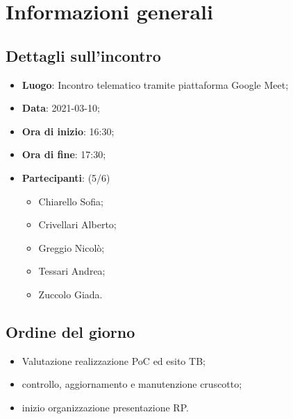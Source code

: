 \section{Informazioni generali}

\subsection{Dettagli sull'incontro}
\begin{itemize}
\item \textbf{Luogo}: Incontro telematico tramite piattaforma Google Meet;
\item \textbf{Data}: 2021-03-10;
\item \textbf{Ora di inizio}: 16:30;
\item \textbf{Ora di fine}: 17:30;
\item \textbf{Partecipanti}: (5/6)
\begin{itemize}
	\item Chiarello Sofia;
	\item Crivellari Alberto;
	\item Greggio Nicolò;
	\item Tessari Andrea;
	\item Zuccolo Giada.
\end{itemize}
\end{itemize}

\subsection{Ordine del giorno}
\begin{itemize}
    \item Valutazione realizzazione PoC ed esito TB;
    \item controllo, aggiornamento e manutenzione cruscotto;
    \item inizio organizzazione presentazione RP.
\end{itemize}


